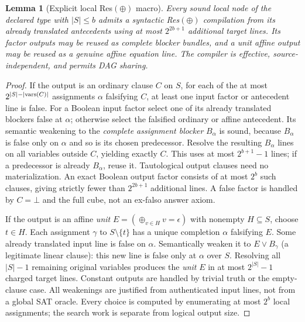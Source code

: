 \documentclass[11pt]{article}
\newtheorem{lemma}[theorem]{Lemma}
\begin{document}
\begin{lemma}[Explicit local Res$(\oplus)$ macro]
Every sound local node of the declared type with $|S|\le b$ admits a syntactic Res$(\oplus)$ compilation from its already translated antecedents using at most $2^{2b+1}$ additional target lines. Its factor outputs may be reused as complete blocker bundles, and a unit affine output may be reused as a genuine affine equation line. The compiler is effective, source-independent, and permits DAG sharing.
\end{lemma}
\begin{proof}
If the output is an ordinary clause $C$ on $S$, for each of the at most $2^{|S|-|{\rm vars}(C)|}$ assignments $\alpha$ falsifying $C$, at least one input factor or antecedent line is false. For a Boolean input factor select one of its already translated blockers false at $\alpha$; otherwise select the falsified ordinary or affine antecedent. Its semantic weakening to the \emph{complete assignment blocker} $B_\alpha$ is sound, because $B_\alpha$ is false only on $\alpha$ and so is its chosen predecessor. Resolve the resulting $B_\alpha$ lines on all variables outside $C$, yielding exactly $C$. This uses at most $2^{b+1}-1$ lines; if a predecessor is already $B_\alpha$, reuse it. Tautological output clauses need no materialization. An exact Boolean output factor consists of at most $2^b$ such clauses, giving strictly fewer than $2^{2b+1}$ additional lines. A false factor is handled by $C=\bot$ and the full cube, not an ex-falso answer axiom.

If the output is an affine \emph{unit} $E=(\oplus_{v\in H}v=\epsilon)$ with nonempty $H\subseteq S$, choose $t\in H$. Each assignment $\gamma$ to $S\setminus\{t\}$ has a unique completion $\alpha$ falsifying $E$. Some already translated input line is false on $\alpha$. Semantically weaken it to $E\vee B_\gamma$ (a legitimate linear clause): this new line is false only at $\alpha$ over $S$. Resolving all $|S|-1$ remaining original variables produces the \emph{unit} $E$ in at most $2^{|S|}-1$ charged target lines. Constant outputs are handled by trivial truth or the empty-clause case. All weakenings are justified from authenticated input lines, not from a global SAT oracle. Every choice is computed by enumerating at most $2^b$ local assignments; the search work is separate from logical output size.
\end{proof}
\end{document}
